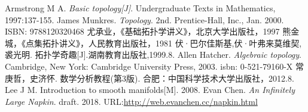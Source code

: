 \documentclass[11pt,A4paper,oneside]{amsart}
\numberwithin{equation}{section}
\theoremstyle{plain}
\theoremstyle{plain}
\numberwithin{equation}{section}
\theoremstyle{remark}
\begin{document}
\begin{thebibliography}{99}


Armstrong M A. \emph{Basic topology[J]}. Undergraduate Texts in Mathematics, 1997:137-155.
James Munkres. \emph{Topology}. 2nd. Prentice-Hall, Inc., Jan. 2000. ISBN: 9788120320468
%
尤承业，《基础拓扑学讲义》，北京大学出版社，1997
%
熊金城，《点集拓扑讲义》，人民教育出版社，1981
%
伏·巴尔佳斯基,伏·叶弗来莫维契,裘光明. 拓扑学奇趣[J].湖南教育出版社,1999.8.
%
Allen Hatcher. \emph{Algebraic topology}. Cambridge, New York: Cambridge University Press, 2003. isbn: 0-521-79160-X
%
常庚哲，史济怀. 数学分析教程(第3版). 合肥：中国科学技术大学出版社，2012.8.
%
Lee J M. Introduction to smooth manifolds[M]. 2008.
Evan Chen. \emph{An Infinitely Large Napkin}. draft. 2018.
URL:\href{http://web.evanchen.cc/napkin.html}{http://web.evanchen.cc/napkin.html}




\end{thebibliography}
\end{document}
